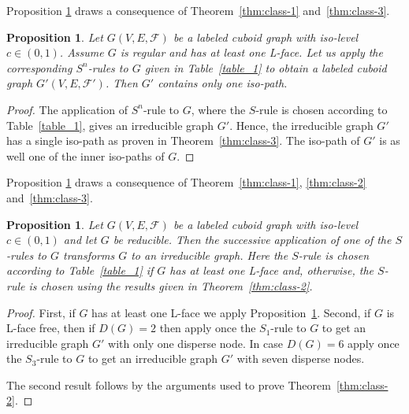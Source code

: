 \documentclass[a4paper,11pt]{article}
\newtheorem{proposition}[theorem]{Proposition}
\begin{document}
Proposition \ref{prop:class-5} draws a consequence of Theorem~\ref{thm:class-1} and~\ref{thm:class-3}.
\begin{proposition}Let $G(V,E,\mathcal{F})$ be a labeled cuboid graph with iso-level $c\in (0,1)$.
Assume $G$ is regular and has at least one L-face. Let us apply the corresponding $S^n$-rules to $G$ given
in Table~\ref{table_1} to obtain a labeled cuboid graph $G'(V,E,\mathcal{F}')$. Then $G'$ contains only one
iso-path.
\label{prop:class-5}
\end{proposition}
\begin{proof}
The application of $S^n$-rule to $G$, where the $S$-rule is chosen according to Table~\ref{table_1},
gives an irreducible graph $G'$. Hence, the irreducible graph $G'$ has a single iso-path as proven in
Theorem~\ref{thm:class-3}. The iso-path of $G'$ is as well one of the inner iso-paths of $G$.
\end{proof}

Proposition \ref{prop:class-6} draws a consequence of Theorem~\ref{thm:class-1}, \ref{thm:class-2}
and~\ref{thm:class-3}.
\begin{proposition}Let $G(V,E,\mathcal{F})$ be a labeled cuboid graph with iso-level $c\in (0,1)$ and let
$G$ be reducible. Then the successive application of one of the $S$-rules to $G$ transforms $G$
to an irreducible graph. Here the $S$-rule is chosen according to Table~\ref{table_1} if $G$ has at
least one L-face and, otherwise, the $S$-rule is chosen using the results given in Theorem~\ref{thm:class-2}.
\label{prop:class-6}
\end{proposition}
\begin{proof} First, if $G$ has at least one L-face we apply
Proposition~\ref{prop:class-5}. Second, if $G$ is L-face free, then if $D(G)=2$ then apply once the
$S_1$-rule to $G$ to get an irreducible graph $G'$ with only one disperse node. In case $D(G)=6$
apply once the $S_3$-rule to $G$ to get an irreducible graph $G'$ with seven disperse nodes.

The second result follows by the arguments used to prove Theorem~\ref{thm:class-2}.
\end{proof}
\end{document}
